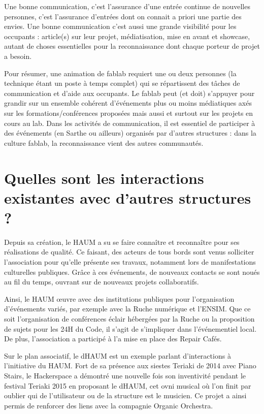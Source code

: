 \documentclass[a4paper,10pt]{scrartcl}
\begin{document}
Une bonne communication, c'est l'assurance d'une entrée continue de nouvelles personnes, c'est l'assurance d'entrées dont on connait a priori une partie des envies. Une bonne communication c'est aussi une grande visibilité pour les occupants : article(s) sur leur projet, médiatisation, mise en avant et showcase, autant de choses essentielles pour la reconnaissance dont chaque porteur de projet a besoin.

Pour résumer, une animation de fablab requiert une ou deux personnes (la technique étant un poste à temps complet) qui se répartissent des tâches de communication et d'aide aux occupants. Le fablab peut (et doit) s'appuyer pour grandir sur un ensemble cohérent d’événements plus ou moins médiatiques axés sur les formations/conférences proposées mais aussi et surtout sur les projets en cours au lab. Dans les activités de communication, il est essentiel de participer à des événements (en Sarthe ou ailleurs) organisés par d'autres structures : dans la culture fablab, la reconnaissance vient des autres communautés.

\section{Quelles sont les interactions existantes avec d'autres structures ?}

Depuis sa création, le HAUM a su se faire connaître et reconnaître pour ses réalisations de qualité. Ce faisant, des acteurs de tous bords sont venus solliciter l'association pour qu'elle présente ses travaux, notamment lors de manifestations culturelles publiques. Grâce à ces événements, de nouveaux contacts se sont noués au fil du temps, ouvrant sur de nouveaux projets collaboratifs.

Ainsi, le HAUM œuvre avec des institutions publiques pour l'organisation d'événements variés, par exemple avec la Ruche numérique et l'ENSIM. Que ce soit l'organisation de conférences éclair hébergées par la Ruche ou la proposition de sujets pour les 24H du Code, il s'agit de s'impliquer dans l'événementiel local. De plus, l'association a participé à l'a mise en place des Repair Cafés.

Sur le plan associatif, le dHAUM est un exemple parlant d'interactions à l'initiative du HAUM. Fort de sa présence aux siestes Teriaki de 2014 avec Piano Stairs, le Hackerspace a démontré une nouvelle fois son inventivité pendant le festival Teriaki 2015 en proposant le dHAUM, cet ovni musical où l'on finit par oublier qui de l'utilisateur ou de la structure est le musicien. Ce projet a ainsi permis de renforcer des liens avec la compagnie Organic Orchestra.
\end{document}
